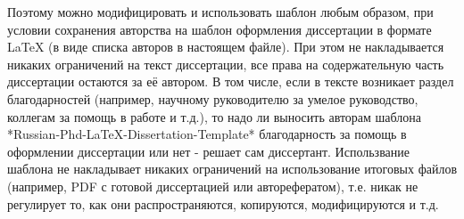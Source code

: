Поэтому можно модифицировать и использовать шаблон любым образом, при
условии сохранения авторства на шаблон оформления диссертации в
формате LaTeX (в виде списка авторов в настоящем файле).  При этом не
накладывается никаких ограничений на текст диссертации, все права на
содержательную часть диссертации остаются за её автором.  В том числе,
если в тексте возникает раздел благодарностей (например, научному
руководителю за умелое руководство, коллегам за помощь в работе и
т.д.), то надо ли выносить авторам шаблона
*Russian-Phd-LaTeX-Dissertation-Template* благодарность за помощь в
оформлении диссертации или нет - решает сам диссертант. Использвание
шаблона не накладывает никаких ограничений на использование итоговых
файлов (например, PDF с готовой диссертацией или авторефератом),
т.е. никак не регулирует то, как они распространяются, копируются,
модифицируются и т.д.










\clearpage

